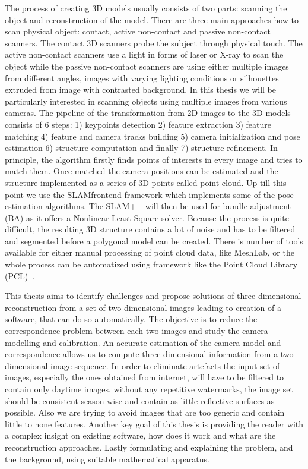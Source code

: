 The process of creating 3D models usually consists of two parts: scanning the object and reconstruction of the model. There are three main approaches how to scan physical object: contact, active non-contact  and passive non-contact scanners. The contact 3D scanners probe the subject through physical touch. The active non-contact scanners use a light in forms of laser or X-ray to scan the object while the passive non-contact scanners are using either multiple images from different angles, images with varying lighting conditions or silhouettes extruded from image with contrasted background. In this thesis we will be particularly interested in scanning objects using multiple images from various cameras. The pipeline of the transformation from 2D images to the 3D models consists of 6 steps: 1) keypoints detection 2) feature extraction  3) feature matching 4) feature and camera tracks building 5) camera initialization and pose estimation 6) structure computation and finally 7) structure refinement. In principle, the algorithm firstly finds points of interests in every image and tries to match them. Once matched the camera positions can be estimated and the structure implemented as a series of 3D points called point cloud. Up till this point we use the SLAM\textunderscore frontend framework which implements some of the pose estimation algorithms. The SLAM++ will then be used for bundle adjustment (BA) as it offers a Nonlinear Least Square solver. Because the process is quite difficult, the resulting 3D structure contains a lot of noise and has to be filtered and segmented before a polygonal model can be created. There is number of tools available for either manual processing of point cloud data, like MeshLab\cite{meshlab}, or the whole process can be automatized using framework like the Point Cloud Library (PCL)~\cite{PCL}.

This thesis aims to identify challenges and propose solutions of three-dimensional reconstruction from a set of two-dimensional images leading to creation of a software, that can do so automatically. The objective is to reduce the correspondence problem between each two images and study the camera modelling and calibration. An accurate estimation of the camera model and correspondence allows us to compute three-dimensional information from a two-dimensional image sequence. In order to eliminate artefacts the input set of images, especially the ones obtained from internet, will have to be filtered to contain only daytime images, without any repetitive watermarks, the image set should be consistent season-wise and contain as little reflective surfaces as possible. Also we are trying to avoid images that are too generic and contain little to none features. Another key goal of this thesis is providing the reader with a complex insight on existing software, how does it work and what are the reconstruction approaches. Lastly formulating and explaining the problem, and the background, using suitable mathematical apparatus.

